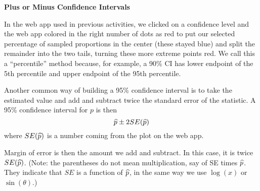 \begin{center}
  {\Large \bf Plus or Minus Confidence Intervals}
\end{center}

In the web app used in previous activities, we clicked on a confidence
level and the web app colored in the right number of dots as red to
put our selected percentage of sampled proportions in the center
(these stayed blue) and split the remainder into the two tails,
turning these more extreme points red.  We call this a ``percentile''
method because, for example, a 90\% CI has lower endpoint of the 5th
percentile and upper endpoint of the 95th percentile.

Another common way of building a 95\% confidence interval is to take
the estimated value and add and subtract twice the standard error of
the statistic.  A 95\% confidence interval for $p$ is then
 $$ \widehat{p} \pm 2 SE(\widehat{p})$$
where $SE(\widehat{p})$ is a number coming from the plot on the web app.

Margin of error is then the amount we add and subtract.  In this case,
it is twice $SE(\widehat{p})$.  (Note: the parentheses do not mean
multiplication, say of SE times $\widehat{p}$. They indicate that $SE$ is a
function of $\widehat{p}$, in the same way we use $\log(x)$ or $\sin(\theta)$.)

